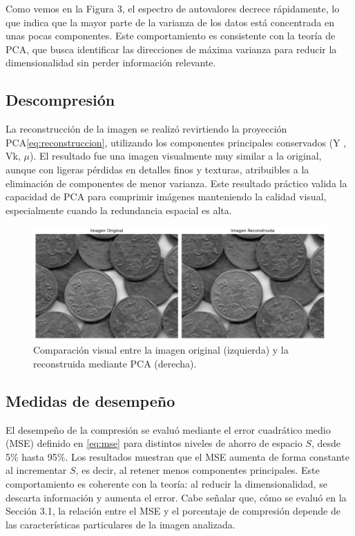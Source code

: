 \documentclass[12pt]{article}
\begin{document}
Como vemos en la Figura 3, el espectro de autovalores decrece rápidamente, lo que indica que la mayor parte de la varianza de los datos está concentrada en unas pocas componentes. Este comportamiento es consistente con la teoría de PCA, que busca identificar las direcciones de máxima varianza para reducir la dimensionalidad sin perder información relevante.

\subsection{Descompresión}

La reconstrucción de la imagen se realizó revirtiendo la proyección PCA\eqref{eq:reconstruccion}, utilizando los componentes principales conservados (Y , Vk, $\mu$). El resultado fue una imagen visualmente muy similar a la original, aunque con ligeras pérdidas en detalles finos y texturas, atribuibles a la eliminación de componentes de menor varianza. Este resultado práctico valida la capacidad de PCA para comprimir imágenes manteniendo la calidad visual, especialmente cuando la redundancia espacial es alta.

\begin{figure}[H]
    \centering
    \includegraphics[width=\textwidth]{Ejercicio4.png}
    \caption{Comparación visual entre la imagen original (izquierda) y la reconstruida mediante PCA (derecha).}
    \label{fig:ej3}
\end{figure}

\subsection{Medidas de desempeño}

El desempeño de la compresión se evaluó mediante el error cuadrático medio (MSE) definido en \eqref{eq:mse} para distintos niveles de ahorro de espacio $S$, desde 5\% hasta 95\%. Los resultados muestran que el MSE aumenta de forma constante al incrementar $S$, es decir, al retener menos componentes principales. Este comportamiento es coherente con la teoría: al reducir la dimensionalidad, se descarta información y aumenta el error. Cabe señalar que, cómo se evaluó en la Sección 3.1, la relación entre el MSE y el porcentaje de compresión depende de las características particulares de la imagen analizada.
\end{document}
